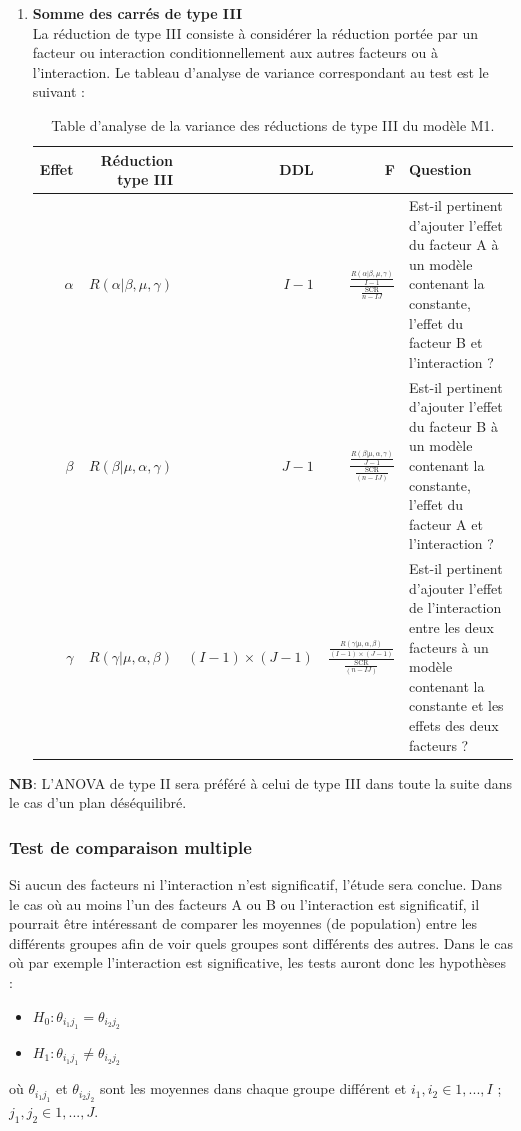 \documentclass[12pt,a4paper]{article}
\begin{document}
\begin{enumerate}[label=\alph*)]
		\item \textbf{Somme des carrés de type III}\\
		La réduction de type III consiste à considérer la réduction portée par un facteur ou interaction conditionnellement aux autres facteurs ou à l'interaction.
		Le tableau d'analyse de variance correspondant au test est le suivant :
		\begin{table}[H]
			\centering
			\begin{tabular}{rrrrp{8cm}}
				\toprule
				\textbf{Effet} & \textbf{Réduction type III} & \textbf{DDL} & \textbf{F} & \textbf{Question} \\
				\midrule
				$\alpha$ & $R(\alpha|\beta, \mu, \gamma)$ & $I-1$ & \LARGE{$\frac{\frac{R(\alpha|\beta, \mu, \gamma)}{I-1}}{\frac{\text{SCR}}{n-IJ}}$} & Est-il pertinent d'ajouter l'effet du facteur A à un modèle contenant la constante, l'effet du facteur B et l'interaction ? \\
				$\beta$ & $R(\beta|\mu, \alpha, \gamma)$ & $J-1$ & \LARGE{$\frac{\frac{R(\beta|\mu, \alpha, \gamma)}{J-1}}{\frac{\text{SCR}}{(n - IJ)}}$} & Est-il pertinent d'ajouter l'effet du facteur B à un modèle contenant la constante, l'effet du facteur A et l'interaction ? \\
				$\gamma$ & $R(\gamma|\mu, \alpha, \beta)$ & $(I-1) \times (J-1)$ & \LARGE{$\frac{\frac{R(\gamma|\mu, \alpha, \beta)}{(I-1) \times (J-1)}}{\frac{\text{SCR}}{(n - IJ)}}$} & Est-il pertinent d'ajouter l'effet de l'interaction entre les deux facteurs à un modèle contenant la constante et les effets des deux facteurs ? \\
				\bottomrule
			\end{tabular}
			\caption{Table d'analyse de la variance des réductions de type III du modèle M1.}
		\end{table}
	\end{enumerate}
	\textbf{NB}: L'ANOVA de type II sera préféré à celui de type III dans toute la suite dans le cas d'un plan déséquilibré.
	\subsubsection{Test de comparaison multiple}
	Si aucun des facteurs ni l'interaction n'est significatif, l'étude sera conclue. Dans le cas où au moins l'un des facteurs A ou B ou l'interaction est significatif, il pourrait être intéressant de comparer les moyennes (de population) entre les différents groupes afin de voir quels groupes sont différents des autres.
	Dans le cas où par exemple l'interaction est significative, les tests auront donc les hypothèses : 
	\begin{itemize}
		\item $H_0 : \theta_{i_1j_1} = \theta_{i_2j_2}$
		\item $H_1 : \theta_{i_1j_1} \neq \theta_{i_2j_2}$
	\end{itemize}
	où $\theta_{i_1j_1}$ et $\theta_{i_2j_2}$ sont les moyennes dans chaque groupe différent et $i_1,i_2\in{1,...,I}$ ; $j_1,j_2\in{1,...,J}$.
	
\end{document}
